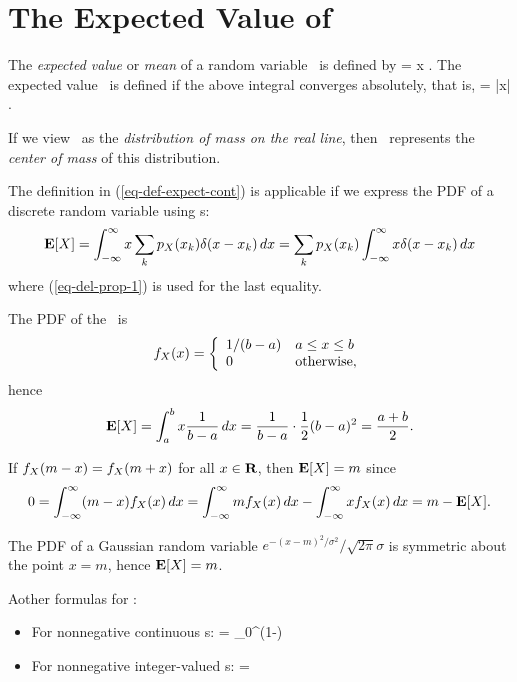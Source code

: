 \eit


\section{The Expected Value of \X}

\bit
	\item The \emph{expected value} or \emph{mean} of a random variable \X\
	is defined by
		 = \intinftoinf x \dx.
	\eeql
	The expected value \ is defined if the above integral converges absolutely,
	that is,
		 = \intinftoinf |x|  \dx.
	\eeql

	\item If we view \
	as the \emph{distribution of mass on the real line},
	then \Exp{X}\ represents the \emph{center of mass} of this distribution.


	\item The definition in (\ref{eq-def-expect-cont})
	is applicable if we express the PDF of a discrete random variable using \delfcn s:
	\[
		{\bf E}[X]
		= \int_{-\infty}^\infty x \sum_k p_{X}(x_k) \delta(x-x_k) {\, dx}
		= \sum_k p_{X}(x_k) \int_{-\infty}^\infty x \delta(x-x_k) {\, dx}
	\]
	where (\ref{eq-del-prop-1}) is used for the last equality.


	\item {}

	The PDF of the \unifrv\ is
	\[
		f_{X}(x) = \left\{\begin{array}{ll}
		1/(b-a)	&a \leq x\leq b
		\\0	&\mbox{otherwise},
		\end{array}
		\right.
	\]
	hence
	\[
		{\bf E}[X] = \int_a^b x \frac{1}{b-a} {\, dx}
		= \frac{1}{b-a} \cdot \frac{1}{2} (b-a)^2
		= \frac{a+b}{2}.
	\]

	\item If $f_{X}(m-x) = f_{X}(m+x)$ for all $x\in{\mbox{\bf R}}$,
	then ${\bf E}[X] = m$ since
	\[
		0 = \int_{-\infty}^\infty (m-x) f_{X}(x) {\, dx}
		= \int_{-\infty}^\infty m f_{X}(x) {\, dx}
		- \int_{-\infty}^\infty x f_{X}(x) {\, dx}
		= m - {\bf E}[X].
	\]


	\item {}

	The PDF of a Gaussian random variable $e^{-(x-m)^2/\sigma^2}/\sqrt{2\pi}\sigma$
	is symmetric about the point $x = m$,
	hence $ = m$.

	\item Aother formulas for :
	\begin{itemize}
		\item For nonnegative continuous \randvar s:
			 = \int_0^\infty (1-) \dx
		\eeql

		\item For nonnegative integer-valued \randvar s:
			\Exp{X} = \sumkztoi \pr{X>k}
		\eeql
	\end{itemize}


